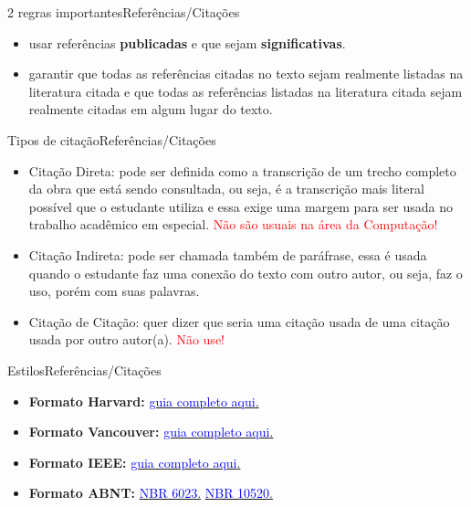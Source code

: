 \documentclass[t]{beamer}
\begin{document}

\begin{ftst}{2 regras importantes}{Referências/Citações}
\justifying
\vone
\begin{itemize}
    \item[1.] usar referências \textbf{publicadas} e que sejam \textbf{significativas}. 
    \item[2.] garantir que todas as referências citadas no texto sejam realmente listadas na literatura citada e que todas as referências listadas na literatura citada sejam realmente citadas em algum lugar do texto.
\end{itemize}

\end{ftst}


\begin{ftst}{Tipos de citação}{Referências/Citações}
\justifying

\begin{itemize}
    \item Citação Direta: pode ser definida como a transcrição de um trecho completo da obra que está sendo consultada, ou seja, é a transcrição mais literal possível que o estudante utiliza e essa exige uma margem para ser usada no trabalho acadêmico em especial. \textcolor{red}{Não são usuais na área da Computação!}
    \vone
    \item Citação Indireta: pode ser chamada também de paráfrase, essa é usada quando o estudante faz uma conexão do texto com outro autor, ou seja, faz o uso, porém com suas palavras.
    \vone
    \item Citação de Citação: quer dizer que seria uma citação usada de uma citação usada por outro autor(a). \textcolor{red}{Não use!}
\end{itemize}
\end{ftst}


\begin{ftst}{Estilos}{Referências/Citações}
\justifying
\begin{itemize}
    \item \textbf{Formato Harvard:} \href{https://www.mendeley.com/guides/harvard-citation-guide}{\textcolor{blue}{guia completo aqui}.}
    \vone
    \item \textbf{Formato Vancouver:} \href{https://guides.lib.monash.edu/citing-referencing/vancouver}{\textcolor{blue}{guia completo aqui}.}
    \vone
    \item \textbf{Formato IEEE:} \href{https://journals.ieeeauthorcenter.ieee.org/your-role-in-article-production/ieee-editorial-style-manual/}{\textcolor{blue}{guia completo aqui}.}
    \vone
    \item \textbf{Formato ABNT:} \href{https://www.ufpe.br/documents/40070/1837975/ABNT+NBR+6023+2018+\%281\%29.pdf/3021f721-5be8-4e6d-951b-fa354dc490ed}{\textcolor{blue}{NBR 6023}.}
    \href{http://www2.uesb.br/biblioteca/wp-content/uploads/2016/05/NBR-10520-CITA\%C3\%87\%C3\%95ES.pdf}{\textcolor{blue}{NBR 10520}.}
\end{itemize}

\end{ftst}
\end{document}
